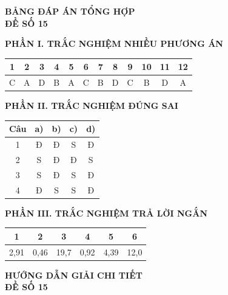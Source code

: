 \documentclass[12pt,a4paper]{article}
\begin{document}
\newpage
\begin{center}{\Large\textbf{BẢNG ĐÁP ÁN TỔNG HỢP}}\\[4pt]\textbf{ĐỀ SỐ 15}\end{center}
\textbf{PHẦN I. TRẮC NGHIỆM NHIỀU PHƯƠNG ÁN}
\begin{center}\renewcommand{\arraystretch}{1.5}\begin{tabular}{|*{12}{c|}}\hline
1 & 2 & 3 & 4 & 5 & 6 & 7 & 8 & 9 & 10 & 11 & 12\\\hline
C & A & D & B & A & C & B & D & C & B & D & A\\\hline
\end{tabular}\end{center}
\textbf{PHẦN II. TRẮC NGHIỆM ĐÚNG SAI}
\begin{center}\renewcommand{\arraystretch}{1.5}\begin{tabular}{|c|c|c|c|c|}\hline
Câu & a) & b) & c) & d)\\\hline
1 & Đ & Đ & S & Đ\\\hline
2 & S & Đ & Đ & S\\\hline
3 & S & Đ & S & Đ\\\hline
4 & Đ & S & S & Đ\\\hline
\end{tabular}\end{center}
\textbf{PHẦN III. TRẮC NGHIỆM TRẢ LỜI NGẮN}
\begin{center}\renewcommand{\arraystretch}{1.5}\begin{tabular}{|c|c|c|c|c|c|}\hline
1 & 2 & 3 & 4 & 5 & 6\\\hline
2,91 & 0,46 & 19,7 & 0,92 & 4,39 & 12,0\\\hline
\end{tabular}\end{center}

\newpage
\begin{center}{\Large\textbf{HƯỚNG DẪN GIẢI CHI TIẾT}}\\[4pt]\textbf{ĐỀ SỐ 15}\end{center}
\end{document}
